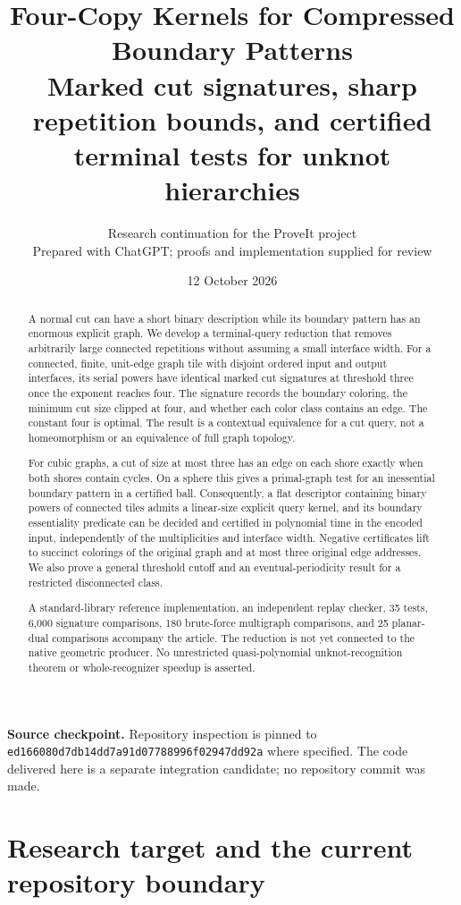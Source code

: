 \documentclass[11pt]{article}
\title{\textbf{Four-Copy Kernels for Compressed Boundary Patterns}\\[0.5em]
\large Marked cut signatures, sharp repetition bounds, and certified terminal tests for unknot hierarchies}
\author{Research continuation for the ProveIt project\\\small Prepared with ChatGPT; proofs and implementation supplied for review}
\date{12 October 2026}
\theoremstyle{remark}\newtheorem{remark}[theorem]{Remark}
\DeclareRobustCommand{\code}[1]{\nolinkurl{#1}}
\begin{document}
\maketitle
\thispagestyle{empty}
\begin{abstract}
A normal cut can have a short binary description while its boundary pattern has an enormous explicit graph. We develop a terminal-query reduction that removes arbitrarily large connected repetitions without assuming a small interface width. For a connected, finite, unit-edge graph tile with disjoint ordered input and output interfaces, its serial powers have identical marked cut signatures at threshold three once the exponent reaches four. The signature records the boundary coloring, the minimum cut size clipped at four, and whether each color class contains an edge. The constant four is optimal. The result is a contextual equivalence for a cut query, not a homeomorphism or an equivalence of full graph topology.

For cubic graphs, a cut of size at most three has an edge on each shore exactly when both shores contain cycles. On a sphere this gives a primal-graph test for an inessential boundary pattern in a certified ball. Consequently, a flat descriptor containing binary powers of connected tiles admits a linear-size explicit query kernel, and its boundary essentiality predicate can be decided and certified in polynomial time in the encoded input, independently of the multiplicities and interface width. Negative certificates lift to succinct colorings of the original graph and at most three original edge addresses. We also prove a general threshold cutoff and an eventual-periodicity result for a restricted disconnected class.

A standard-library reference implementation, an independent replay checker, 35 tests, 6,000 signature comparisons, 180 brute-force multigraph comparisons, and 25 planar-dual comparisons accompany the article. The reduction is not yet connected to the native geometric producer. No unrestricted quasi-polynomial unknot-recognition theorem or whole-recognizer speedup is asserted.
\end{abstract}
\vfill
\noindent\textbf{Source checkpoint.} Repository inspection is pinned to
\code{ed166080d7db14dd7a91d07788996f02947dd92a} where specified. The code delivered here is a separate integration candidate; no repository commit was made.
\clearpage
\setcounter{tocdepth}{1}
\tableofcontents
\clearpage

\section{Research target and the current repository boundary}
\end{document}
